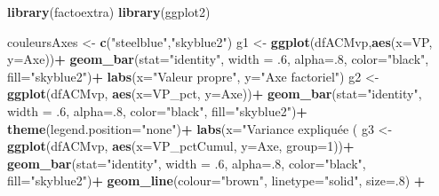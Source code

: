 \documentclass[
  11pt,
  french,
]{book}
\makeatletter
\newenvironment{Shaded}{\begin{snugshade}}{\end{snugshade}}
\newcommand{\DataTypeTok}[1]{\textcolor[rgb]{0.13,0.29,0.53}{#1}}
\newcommand{\DecValTok}[1]{\textcolor[rgb]{0.00,0.00,0.81}{#1}}
\newcommand{\FloatTok}[1]{\textcolor[rgb]{0.00,0.00,0.81}{#1}}
\newcommand{\KeywordTok}[1]{\textcolor[rgb]{0.13,0.29,0.53}{\textbf{#1}}}
\newcommand{\NormalTok}[1]{#1}
\newcommand{\OperatorTok}[1]{\textcolor[rgb]{0.81,0.36,0.00}{\textbf{#1}}}
\newcommand{\StringTok}[1]{\textcolor[rgb]{0.31,0.60,0.02}{#1}}
\newenvironment{kframe}{%
\medskip{}
\setlength{\fboxsep}{.8em}
 \def\at@end@of@kframe{}%
 \ifinner\ifhmode%
  \def\at@end@of@kframe{\end{minipage}}%
  \begin{minipage}{\columnwidth}%
 \fi\fi%
 \def\FrameCommand##1{\hskip\@totalleftmargin \hskip-\fboxsep
 \colorbox{shadecolor}{##1}\hskip-\fboxsep
     \hskip-\linewidth \hskip-\@totalleftmargin \hskip\columnwidth}%
 \MakeFramed {\advance\hsize-\width
   \@totalleftmargin\z@ \linewidth\hsize
   \@setminipage}}%
 {\par\unskip\endMakeFramed%
 \at@end@of@kframe}
\renewenvironment{Shaded}{\begin{kframe}}{\end{kframe}}
\makeatother
\begin{document}
\begin{Shaded}
\begin{Highlighting}[]
\KeywordTok{library}\NormalTok{(factoextra)}
\KeywordTok{library}\NormalTok{(ggplot2)}

\NormalTok{couleursAxes <-}\StringTok{ }\KeywordTok{c}\NormalTok{(}\StringTok{"steelblue"}\NormalTok{,}\StringTok{"skyblue2"}\NormalTok{)}
\NormalTok{g1 <-}\StringTok{ }\KeywordTok{ggplot}\NormalTok{(dfACMvp,}\KeywordTok{aes}\NormalTok{(}\DataTypeTok{x=}\NormalTok{VP, }\DataTypeTok{y=}\NormalTok{Axe))}\OperatorTok{+}
\StringTok{  }\KeywordTok{geom_bar}\NormalTok{(}\DataTypeTok{stat=}\StringTok{"identity"}\NormalTok{, }\DataTypeTok{width =} \FloatTok{.6}\NormalTok{, }\DataTypeTok{alpha=}\NormalTok{.}\DecValTok{8}\NormalTok{, }\DataTypeTok{color=}\StringTok{"black"}\NormalTok{, }\DataTypeTok{fill=}\StringTok{"skyblue2"}\NormalTok{)}\OperatorTok{+}
\StringTok{  }\KeywordTok{labs}\NormalTok{(}\DataTypeTok{x=}\StringTok{"Valeur propre"}\NormalTok{, }\DataTypeTok{y=}\StringTok{"Axe factoriel"}\NormalTok{)}
\NormalTok{g2 <-}\StringTok{ }\KeywordTok{ggplot}\NormalTok{(dfACMvp, }\KeywordTok{aes}\NormalTok{(}\DataTypeTok{x=}\NormalTok{VP_pct, }\DataTypeTok{y=}\NormalTok{Axe))}\OperatorTok{+}
\StringTok{  }\KeywordTok{geom_bar}\NormalTok{(}\DataTypeTok{stat=}\StringTok{"identity"}\NormalTok{, }\DataTypeTok{width =} \FloatTok{.6}\NormalTok{, }\DataTypeTok{alpha=}\NormalTok{.}\DecValTok{8}\NormalTok{, }\DataTypeTok{color=}\StringTok{"black"}\NormalTok{, }\DataTypeTok{fill=}\StringTok{"skyblue2"}\NormalTok{)}\OperatorTok{+}
\StringTok{  }\KeywordTok{theme}\NormalTok{(}\DataTypeTok{legend.position=}\StringTok{"none"}\NormalTok{)}\OperatorTok{+}
\StringTok{  }\KeywordTok{labs}\NormalTok{(}\DataTypeTok{x=}\StringTok{"Variance expliquée (%
\NormalTok{g3 <-}\StringTok{ }\KeywordTok{ggplot}\NormalTok{(dfACMvp, }\KeywordTok{aes}\NormalTok{(}\DataTypeTok{x=}\NormalTok{VP_pctCumul, }\DataTypeTok{y=}\NormalTok{Axe, }\DataTypeTok{group=}\DecValTok{1}\NormalTok{))}\OperatorTok{+}
\StringTok{  }\KeywordTok{geom_bar}\NormalTok{(}\DataTypeTok{stat=}\StringTok{"identity"}\NormalTok{, }\DataTypeTok{width =} \FloatTok{.6}\NormalTok{, }\DataTypeTok{alpha=}\NormalTok{.}\DecValTok{8}\NormalTok{, }\DataTypeTok{color=}\StringTok{"black"}\NormalTok{, }\DataTypeTok{fill=}\StringTok{"skyblue2"}\NormalTok{)}\OperatorTok{+}
\StringTok{  }\KeywordTok{geom_line}\NormalTok{(}\DataTypeTok{colour=}\StringTok{"brown"}\NormalTok{, }\DataTypeTok{linetype=}\StringTok{"solid"}\NormalTok{, }\DataTypeTok{size=}\NormalTok{.}\DecValTok{8}\NormalTok{) }\OperatorTok{+}
}
\end{Highlighting}
\end{Shaded}
\end{document}
